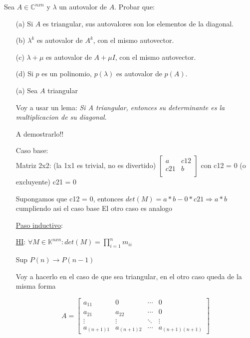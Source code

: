 \begin{enunciado}{\ejercicio}
Sea $A \in \mathbb{C}^{nxn}$ y $\lambda$ un autovalor de $A$. Probar que:
\begin{itemize}
    \item[(a)] Si $A$ es triangular, sus autovalores son los elementos de la diagonal.
    \item[(b)] $\lambda^k$ es autovalor de $A^k$, con el mismo autovector.
    \item[(c)] $\lambda + \mu$ es autovalor de $A + \mu I$, con el mismo autovector.
    \item[(d)] Si $p$ es un polinomio, $p(\lambda)$ es autovalor de $p(A)$.
\end{itemize}
\end{enunciado}

\begin{itemize}
    \item [(a)]
    Sea $A$ triangular

    Voy a usar un lema: \textit{Si A triangular, entonces su determinante es la multiplicacion de su diagonal}.

    A demostrarlo!!

    Caso base: \\
        Matriz 2x2: (la 1x1 es trivial, no es divertido)
        $
        \begin{bmatrix}
            a & c12 \\
            c21 & b  \\
            \end{bmatrix}
            $
        con c12 = 0 (o excluyente) c21 = 0

        Supongamos que c12 = 0, entonces $det(M) = a * b - 0 * c21 \Rightarrow a*b$ cumpliendo asi el caso base
        El otro caso es analogo
    
    \underline{Paso inductivo}:

        \underline{HI}: $\forall M \in \mathbb{K}^{nxn}: det(M) = \prod_{i=1}^{n}m_{ii}$

        Sup $P(n) \rightarrow P(n-1)$

        Voy a hacerlo en el caso de que sea triangular, en el otro caso queda de la misma forma

        \[
        A = \begin{bmatrix}
            a_{11} & 0 & \cdots & 0 \\
            a_{21} & a_{22} & \cdots & 0  \\
            \vdots & \vdots & \ddots & \vdots \\
            a_{(n+1)1} & a_{(n+1)2} & \cdots & a_{(n+1)(n+1)}
        \end{bmatrix}
            \]


\end{itemize}
